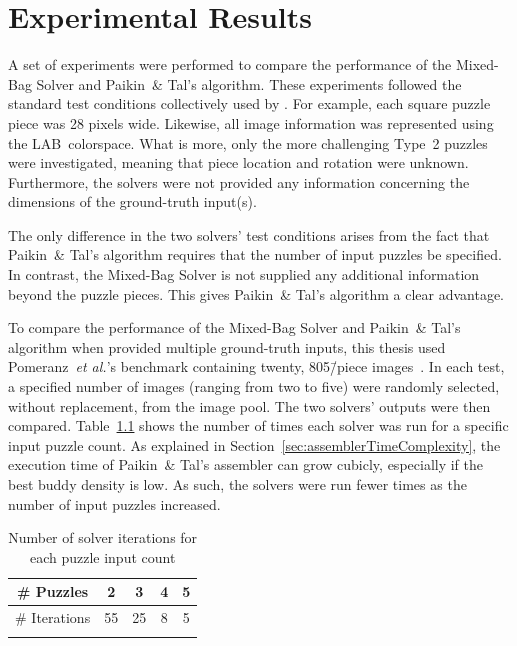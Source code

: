 \chapter{Experimental Results}\label{chap:experimentalResults}

A set of experiments were performed to compare the performance of the Mixed-Bag Solver and Paikin~\& Tal's algorithm.  These experiments followed the standard test conditions collectively used by \cite{cho2010, pomeranz2011, gallagher2012, sholomon2013, paikin2015}.  For example, each square puzzle piece was 28 pixels wide.  Likewise, all image information was represented using the LAB~colorspace.  What is more, only the more challenging Type~2 puzzles were investigated, meaning that piece location and rotation were unknown.  Furthermore, the solvers were not provided any information concerning the dimensions of the ground-truth input(s).

The only difference in the two solvers' test conditions arises from the fact that Paikin~\& Tal's algorithm requires that the number of input puzzles be specified. In contrast, the Mixed-Bag Solver is not supplied any additional information beyond the puzzle pieces.  This gives Paikin~\& Tal's algorithm a clear advantage.

To compare the performance of the Mixed-Bag Solver and Paikin~\& Tal's algorithm when provided multiple ground-truth inputs, this thesis used Pomeranz~\textit{et al.}'s benchmark containing twenty, 805\=/piece images~\cite{pomeranzBenchmarkImages}.  In each test, a specified number of images (ranging from two to five) were randomly selected, without replacement, from the image pool.  The two solvers' outputs were then compared.  Table~\ref{tab:numberSolverIterations} shows the number of times each solver was run for a specific input puzzle count. As explained in Section~\ref{sec:assemblerTimeComplexity}, the execution time of Paikin~\& Tal's assembler can grow cubicly, especially if the best buddy density is low.  As such, the solvers were run fewer times as the number of input puzzles increased.

\begin{table}[tb]
  \begin{center}
    \caption{Number of solver iterations for each puzzle input count}\label{tab:numberSolverIterations}
    \begin{tabular}{ |c||c|c|c|c| } 
      \Xhline{1pt}
       \# Puzzles    &  2 &  3 & 4 & 5 \\ 
      \hline \hline
       \# Iterations & 55 & 25 & 8 & 5 \\ 
       \Xhline{1pt}
    \end{tabular}
  \end{center}
\end{table}

